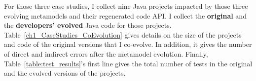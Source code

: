 For those three case studies, I collect nine Java projects impacted by those three evolving metamodels and their regenerated code API. I collect the \textbf{original} and the \textbf{developers' evolved} Java code for those projects.
%
Table~\ref{ch1_CaseStudies_CoEvolution} gives details on the size of the projects and code of the original versions that I co-evolve.  In addition, it gives the number of direct and indirect errors after the metamodel evolution. Finally, Table~\ref{table:test_results}'s first line gives the total number of tests in the original and the evolved versions of the projects.

